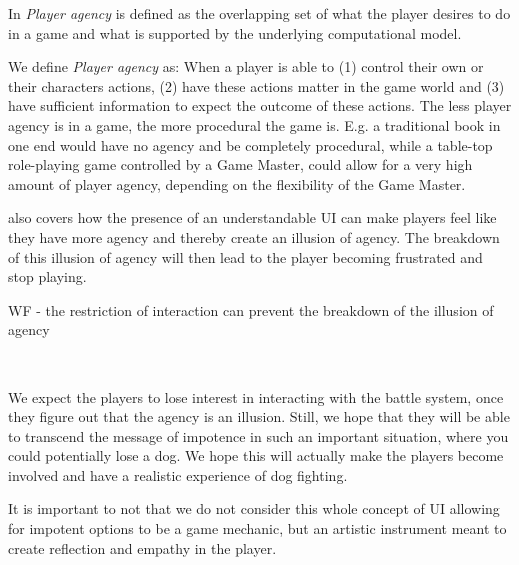 In \citep{wardrip2009agency} \textit{Player agency} is defined as the overlapping set of what the player desires to do in a game and what is supported by the underlying computational model.\

We define \textit{Player agency} as: When a player is able to (1) control their own or their characters actions, (2) have these actions matter in the game world and (3) have sufficient information to expect the outcome of these actions. The less player agency is in a game, the more procedural the game is. E.g. a traditional book in one end would have no agency and be completely procedural, while a table-top role-playing game controlled by a Game Master, could allow for a very high amount of player agency, depending on the flexibility of the Game Master.\

\citep{wardrip2009agency} also covers how the presence of an understandable UI can make players feel like they have more agency and thereby create an illusion of agency. The breakdown of this illusion of agency will then lead to the player becoming frustrated and stop playing.\

WF - the restriction of interaction can prevent the breakdown of the illusion of agency\
\

\


We expect the players to lose interest in interacting with the battle system, once they figure out that the agency is an illusion. Still, we hope that they will be able to transcend the message of impotence in such an important situation, where you could potentially lose a dog. 
We hope this will actually make the players become involved and have a realistic experience of dog fighting. \

It is important to not that we do not consider this whole concept of UI allowing for impotent options to be a game mechanic, but an artistic instrument meant to create reflection and empathy in the player. \
